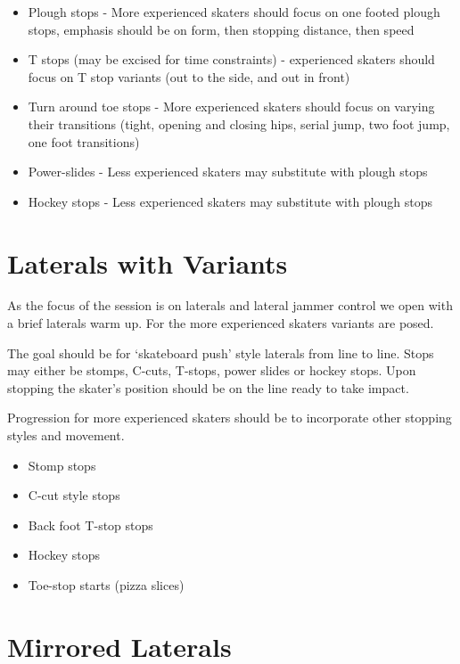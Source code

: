 \documentclass{journal}
\begin{document}
\begin{itemize}
    \item Plough stops - More experienced skaters should focus on one footed plough stops, emphasis should be on form, then stopping distance, then speed 
    \item T stops (may be excised for time constraints) - experienced skaters should focus on T stop variants (out to the side, and out in front)  
    \item Turn around toe stops - More experienced skaters should focus on varying their transitions (tight, opening and closing hips, serial jump, two foot jump, one foot transitions)    
    \item Power-slides - Less experienced skaters may substitute with plough stops
    \item Hockey stops - Less experienced skaters may substitute with plough stops
\end{itemize}



\section*{Laterals with Variants}
\label{drill:laterals}

As the focus of the session is on laterals and lateral jammer control we open with a brief laterals warm up. 
For the more experienced skaters variants are posed.

The goal should be for `skateboard push' style laterals from line to line.
Stops may either be stomps, C-cuts, T-stops, power slides or hockey stops. 
Upon stopping the skater's position should be on the line ready to take impact. 


Progression for more experienced skaters should be to incorporate other stopping styles and movement.

\begin{itemize}
    \item Stomp stops
    \item C-cut style stops 
    \item Back foot T-stop stops
    \item Hockey stops
    \item Toe-stop starts (pizza slices)
\end{itemize}


\section*{Mirrored Laterals}
\label{drill:laterals:mirrored}
\end{document}
